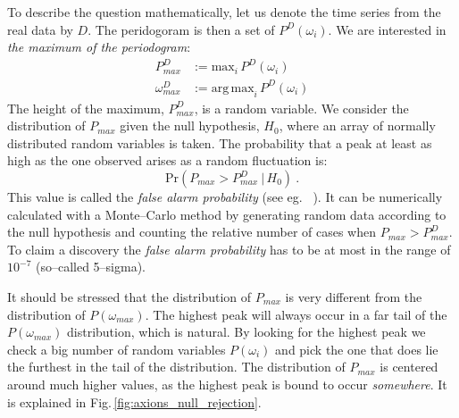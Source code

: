 To describe the question mathematically, let us denote the time series from the real data by $D$. The peridogoram is then a set of $P^D(\omega_i)$. We are interested in \emph{the maximum of the periodogram}:
\begin{align}
  P_{max}^D &:= \mathrm{max}_i\,P^D(\omega_i) \\
  \omega_{max}^D &:= \mathrm{arg\,max}_i\,P^D(\omega_i)
\end{align}
The height of the maximum, $P_{max}^D$, is a random variable. We consider the distribution of $P_{max}$ given the null hypothesis, $H_0$, where an array of normally distributed random variables is taken. The probability that a peak at least as high as the one observed arises as a random fluctuation is:
\begin{equation}
  \mathrm{Pr}\left( P_{max} > P_{max}^D\ |\, H_0 \right) \ .
\end{equation}
This value is called the \emph{false alarm probability} (see eg. \citeauthor{Pandola2004}~\citep{Pandola2004}). It can be numerically calculated with a Monte--Carlo method by generating random data according to the null hypothesis and counting the relative number of cases when $P_{max} > P_{max}^D$. To claim a discovery the \emph{false alarm probability} has to be at most in the range of $10^{-7}$ (so--called 5--sigma).

It should be stressed that the distribution of $P_{max}$ is very different from the distribution of $P(\omega_{max})$. The highest peak will always occur in a far tail of the $P(\omega_{max})$ distribution, which is natural. By looking for the highest peak we check a big number of random variables $P(\omega_i)$ and pick the one that does lie the furthest in the tail of the distribution. The distribution of $P_{max}$ is centered around much higher values, as the highest peak is bound to occur \emph{somewhere}. It is explained in Fig.\,\ref{fig:axions_null_rejection}.

